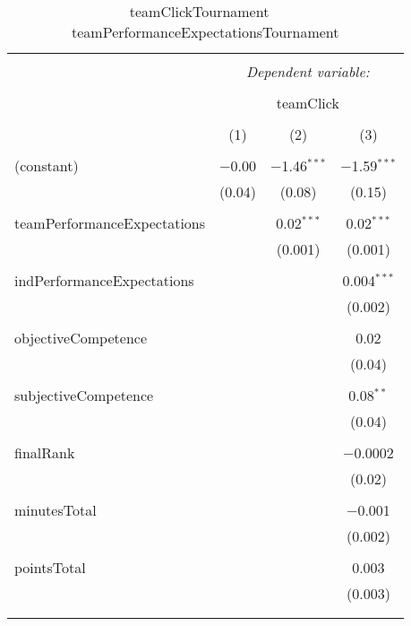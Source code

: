 
\begin{table}[!htbp] \centering 
  \caption{teamClickTournament ~ teamPerformanceExpectationsTournament} 
  \label{tab:MLM31ateamPerfClickTournament} 
\footnotesize 
\begin{tabular}{@{\extracolsep{5pt}}lccc} 
\\[-1.8ex]\hline 
\hline \\[-1.8ex] 
 & \multicolumn{3}{c}{\textit{Dependent variable:}} \\ 
\cline{2-4} 
\\[-1.8ex] & \multicolumn{3}{c}{teamClick} \\ 
\\[-1.8ex] & (1) & (2) & (3)\\ 
\hline \\[-1.8ex] 
 (constant) & $-$0.00 & $-$1.46$^{***}$ & $-$1.59$^{***}$ \\ 
  & (0.04) & (0.08) & (0.15) \\ 
  & & & \\ 
 teamPerformanceExpectations &  & 0.02$^{***}$ & 0.02$^{***}$ \\ 
  &  & (0.001) & (0.001) \\ 
  & & & \\ 
 indPerformanceExpectations &  &  & 0.004$^{***}$ \\ 
  &  &  & (0.002) \\ 
  & & & \\ 
 objectiveCompetence &  &  & 0.02 \\ 
  &  &  & (0.04) \\ 
  & & & \\ 
 subjectiveCompetence &  &  & 0.08$^{**}$ \\ 
  &  &  & (0.04) \\ 
  & & & \\ 
 finalRank &  &  & $-$0.0002 \\ 
  &  &  & (0.02) \\ 
  & & & \\ 
 minutesTotal &  &  & $-$0.001 \\ 
  &  &  & (0.002) \\ 
  & & & \\ 
 pointsTotal &  &  & 0.003 \\ 
  &  &  & (0.003) \\ 
  & & & \\ 
\hline \\[-1.8ex] 

\end{tabular}
\end{table}
